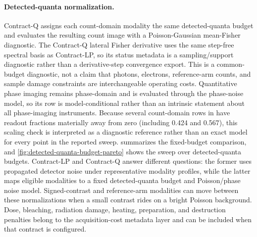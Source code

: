 \paragraph{Detected-quanta normalization.} Contract-Q assigns each count-domain modality the same detected-quanta budget and evaluates the resulting count image with a Poisson-Gaussian mean-Fisher diagnostic. The Contract-Q lateral Fisher derivative uses the same step-free spectral basis as Contract-LP, so its status metadata is a sampling/support diagnostic rather than a derivative-step convergence export. This is a common-budget diagnostic, not a claim that photons, electrons, reference-arm counts, and sample damage constraints are interchangeable operating costs. Quantitative phase imaging remains phase-domain and is evaluated through the phase-noise model, so its row is model-conditional rather than an intrinsic statement about all phase-imaging instruments. Because several count-domain rows in  have readout fractions materially away from zero (including 0.424 and 0.567), this scaling check is interpreted as a diagnostic reference rather than an exact model for every point in the reported sweep.  summarizes the fixed-budget comparison, and \cref{fig:detected-quanta-budget-pareto} shows the sweep over detected-quanta budgets. Contract-LP and Contract-Q answer different questions: the former uses propagated detector noise under representative modality profiles, while the latter maps eligible modalities to a fixed detected-quanta budget and Poisson/phase noise model. Signed-contrast and reference-arm modalities can move between these normalizations when a small contrast rides on a bright Poisson background. Dose, bleaching, radiation damage, heating, preparation, and destruction penalties belong to the acquisition-cost metadata layer and can be included when that contract is configured.


